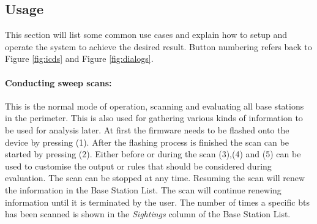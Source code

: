 \subsection{Usage}
\label{sec:user_mode}
This section will list some common use cases and explain how to setup and operate the system to achieve the desired result.
Button numbering refers back to Figure \ref{fig:icds} and Figure \ref{fig:dialogs}.

\paragraph{Conducting sweep scans:} This is the normal mode of operation, scanning and evaluating all base stations in the perimeter.
This is also used for gathering various kinds of information to be used for analysis later.
At first the firmware needs to be flashed onto the device by pressing (1).
After the flashing process is finished the scan can be started by pressing (2).
Either before or during the scan (3),(4) and (5) can be used to customise the output or rules that should be considered during evaluation.
The scan can be stopped at any time.
Resuming the scan will renew the information in the Base Station List.
The scan will continue renewing information until it is terminated by the user.
The number of times a specific \gls{bts} has been scanned is shown in the \emph{Sightings} column of the Base Station List.

